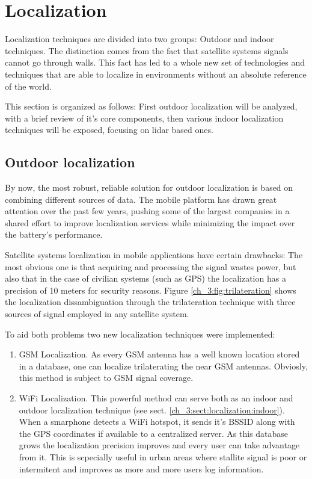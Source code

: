   \section{Localization}

    Localization techniques are divided into two groups: Outdoor and indoor techniques. The distinction comes from the fact that satellite systems signals cannot go through walls. This fact has led to a whole new set of technologies and techniques that are able to localize in environments without an absolute reference of the world.

    This section is organized as follows: First outdoor localization will be analyzed, with a brief review of it's core components, then various indoor localization techniques will be exposed, focusing on lidar based ones.

    \subsection{Outdoor localization} \label{ch_3:sect:localization:outdoor}

      By now, the most robust, reliable solution for outdoor localization is based on combining different sources of data. The mobile platform has drawn great attention over the past few years, pushing some of the largest companies in a shared effort to improve localization services while minimizing the impact over the battery's performance.

      Satellite systems localization in mobile applications have certain drawbacks: The most obvious one is that acquiring and processing the signal wastes power, but also that in the case of civilian systems (such as GPS) the localization has a precision of 10 meters for security reasons. Figure \ref{ch_3:fig:trilateration} shows the localization dissambiguation through the trilateration technique with three sources of signal employed in any satellite system.

      To aid both problems two new localization techniques were implemented:
      \begin{enumerate}
        \item GSM Localization. As every GSM antenna has a well known location stored in a database, one can localize trilaterating the near GSM antennas. Obviosly, this method is subject to GSM signal coverage.
        \item WiFi Localization. This powerful method can serve both as an indoor and outdoor localization technique (see sect. \ref{ch_3:sect:localization:indoor}). When a smarphone detects a WiFi hotspot, it sends it's BSSID along with the GPS coordinates if available to a centralized server. As this database grows the localization precision improves and every user can take advantage from it. This is scpecially useful in urban areas where stallite signal is poor or intermitent and improves as more and more users log information.
      \end{enumerate}

